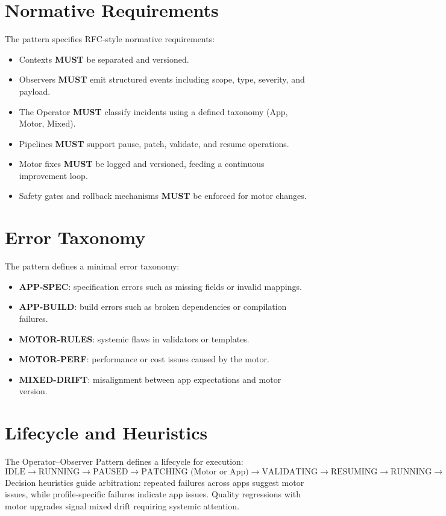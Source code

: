 \documentclass[11pt,a4paper]{article}
\begin{document}
\section{Normative Requirements}
The pattern specifies RFC-style normative requirements:
\begin{itemize}
    \item Contexts \textbf{MUST} be separated and versioned.
    \item Observers \textbf{MUST} emit structured events including scope, type, severity, and payload.
    \item The Operator \textbf{MUST} classify incidents using a defined taxonomy (App, Motor, Mixed).
    \item Pipelines \textbf{MUST} support pause, patch, validate, and resume operations.
    \item Motor fixes \textbf{MUST} be logged and versioned, feeding a continuous improvement loop.
    \item Safety gates and rollback mechanisms \textbf{MUST} be enforced for motor changes.
\end{itemize}

\section{Error Taxonomy}
The pattern defines a minimal error taxonomy:
\begin{itemize}
    \item \textbf{APP-SPEC}: specification errors such as missing fields or invalid mappings.
    \item \textbf{APP-BUILD}: build errors such as broken dependencies or compilation failures.
    \item \textbf{MOTOR-RULES}: systemic flaws in validators or templates.
    \item \textbf{MOTOR-PERF}: performance or cost issues caused by the motor.
    \item \textbf{MIXED-DRIFT}: misalignment between app expectations and motor version.
\end{itemize}

\section{Lifecycle and Heuristics}
The Operator--Observer Pattern defines a lifecycle for execution:
\[
\text{IDLE} \rightarrow \text{RUNNING} \rightarrow \text{PAUSED} \rightarrow \text{PATCHING (Motor or App)} \rightarrow \text{VALIDATING} \rightarrow \text{RESUMING} \rightarrow \text{RUNNING} \rightarrow (\text{SUCCESS or FAILED})
\]
Decision heuristics guide arbitration: repeated failures across apps suggest motor issues, while profile-specific failures indicate app issues. Quality regressions with motor upgrades signal mixed drift requiring systemic attention.
\end{document}
